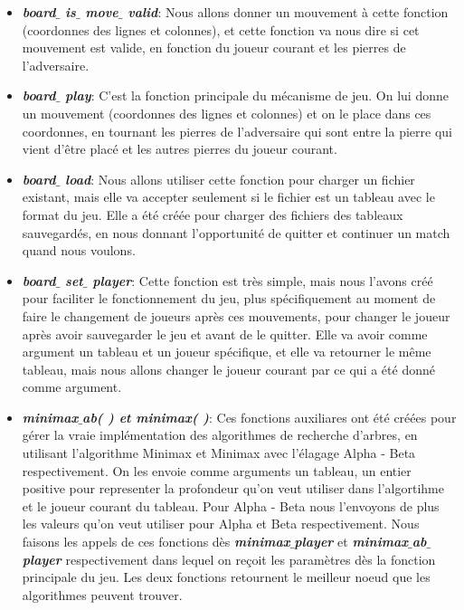 \documentclass[a4paper,12pt]{article}
\begin{document}
\begin{itemize}
	\item \textbf{\textit{board$ \_ $ is$ \_ $ move$ \_ $ valid}}: Nous allons donner un mouvement à cette fonction (coordonnes des lignes et colonnes), et cette fonction va nous dire si cet mouvement est valide, en fonction du joueur courant et les pierres de l’adversaire.\par

	\item \textbf{\textit{board$ \_ $ play}}: C’est la fonction principale du mécanisme de jeu. On lui donne un mouvement (coordonnes des lignes et colonnes) et on le place dans ces coordonnes, en tournant les pierres de l’adversaire qui sont entre la pierre qui vient d’être placé et les autres pierres du joueur courant. \par


	\item \textbf{\textit{board$ \_ $ load}}: Nous allons utiliser cette fonction pour charger un fichier existant, mais elle va accepter seulement si le fichier est un tableau avec le format du jeu. Elle a été créée pour charger des fichiers des tableaux sauvegardés, en nous donnant l’opportunité de quitter et continuer un match quand nous voulons.\par


	\item \textbf{\textit{board$ \_ $ set$ \_ $ player}}: Cette fonction est très simple, mais nous l’avons créé pour faciliter le fonctionnement du jeu, plus spécifiquement au moment de faire le changement de joueurs après ces mouvements, pour changer le joueur après avoir sauvegarder le jeu et avant de le quitter. Elle va avoir comme argument un tableau et un joueur spécifique, et elle va retourner le même tableau, mais nous allons changer le joueur courant par ce qui a été donné comme argument.\par
	

	\item \textbf{\textit{minimax$ \_ $ab( ) et minimax( )}}: Ces fonctions auxiliares ont été créées pour gérer la vraie implémentation des algorithmes de recherche d'arbres, en utilisant l'algorithme Minimax et Minimax avec l'élagage Alpha - Beta respectivement. On les envoie comme arguments un tableau, un entier positive pour representer la profondeur qu'on veut utiliser dans l'algortihme et le joueur courant du tableau. Pour Alpha - Beta nous l'envoyons de plus les valeurs qu'on veut utiliser pour Alpha et Beta respectivement. Nous faisons les appels de ces fonctions dès \textbf{\textit{minimax$ \_ $player}} et \textbf{\textit{minimax$ \_ $ab$ \_ $player}} respectivement dans lequel on reçoit les paramètres dès la fonction principale du jeu. Les deux fonctions retournent le meilleur noeud que les algorithmes peuvent trouver.\par





\end{itemize}
\end{document}
